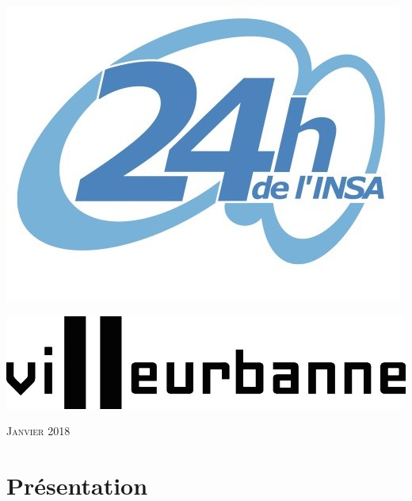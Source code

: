 \documentclass[hidelinks, paper=a4, fontsize=13pt]{report}
\begin{document}
   \begin{minipage}[c]{.46\linewidth}
\includegraphics[scale=1]{Annexes/Images/logo24h.jpg}\\
   \end{minipage} \hfill
   \begin{minipage}[c]{.46\linewidth}
\includegraphics[scale=1]{Annexes/Images/villeurnoir}\\
   \end{minipage}
\begin{flushright}
\vspace{15mm}


{\large\textsc{Janvier 2018}}

\vspace{15mm}


\end{flushright}

\newpage


\chapter{Présentation}
\end{document}
